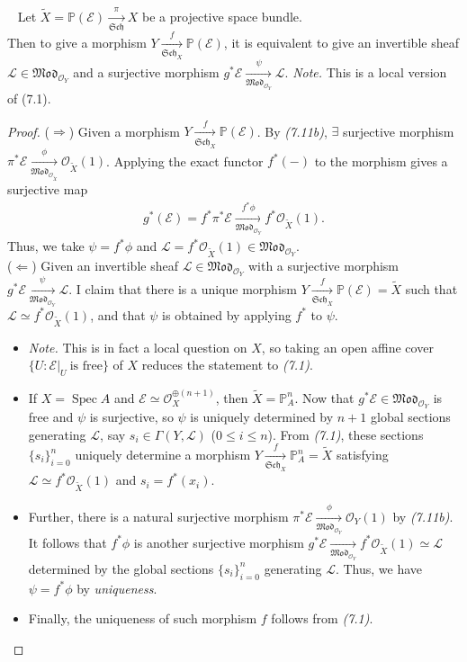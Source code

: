 \documentclass[11pt,a4paper,footinclude=true,headinclude=true]{scrbook} %
\DeclareMathOperator{\Spec}{Spec}
\newcommand{\EE}{\mathscr{E}}
\newcommand{\LL}{\mathscr{L}}
\newcommand{\OO}{\mathcal{O}}
\newcommand{\PP}{\mathbb{P}}
\newcommand{\Sch}{\mathfrak{Sch}}
\newcommand{\<}{\langle}
\newcommand{\>}{\rangle}
\newcommand{\MOD}{\mathfrak{Mod}}
\newenvironment{proposition}[2][]
{\renewcommand\theinnercustomprop{#2}\innercustomprop[#1] 
\begin{mdframed}[backgroundcolor=gray!20]\ }
{\end{mdframed}\endinnercustomprop}
\begin{document}
\begin{proposition}{7.12}
    Let $\widetilde{X}=\PP(\EE)\xrightarrow[\Sch]{\pi}X$ be a projective space bundle.\\ Then to give a morphism $Y\xrightarrow[\Sch_X]{f}\PP(\EE)$, it is equivalent to give an invertible sheaf $\LL\in\MOD_{\OO_Y}$ and a surjective morphism $g^\ast\EE\xrightarrow[\MOD_{\OO_Y}]{\psi}\LL$. \textit{Note.} This is a local version of (7.1).
\end{proposition}
\begin{proof}
    ($\Rightarrow$) Given a morphism $Y\xrightarrow[\Sch_X]{f}\PP(\EE)$. By \textit{(7.11b)}, $\exists$ surjective morphism $\pi^\ast\EE\xrightarrow[\MOD_{\OO_{\widetilde{X}}}]{\phi}\OO_{\widetilde{X}}(1)$. Applying the exact functor $f^\ast(-)$ to the morphism gives a surjective map 
    \begin{align*}
        g^\ast(\EE)=f^\ast\pi^\ast\EE\xrightarrow[\MOD_{\OO_Y}]{f^\ast\phi}f^\ast\OO_{\widetilde{X}}(1).
    \end{align*}
    Thus, we take $\psi=f^\ast\phi$ and $\LL=f^\ast\OO_{\widetilde{X}}(1)\in\MOD_{\OO_Y}$.\\
    
    ($\Leftarrow$) Given an invertible sheaf $\LL\in\MOD_{\OO_Y}$ with a surjective morphism $g^\ast\EE\xrightarrow[\MOD_{\OO_Y}]{\psi}\LL$. I claim that there is a unique morphism $Y\xrightarrow[\Sch_X]{f}\PP(\EE)=\widetilde{X}$ such that $\LL\simeq f^\ast\OO_{\widetilde{X}}(1)$, and that $\psi$ is obtained by applying $f^\ast$ to $\psi$.
    \begin{itemize}
        \item \textit{Note.} This is in fact a local question on $X$, so taking an open affine cover $\{U:\EE|_U\ \text{is free}\}$ of $X$ reduces the statement to \textit{(7.1)}.
        \item If $X=\Spec A$ and $\EE\simeq\OO_X^{\oplus(n+1)}$, then $\widetilde{X}=\PP_A^n$. Now that $g^\ast\EE\in\MOD_{\OO_Y}$ is free and $\psi$ is surjective, so $\psi$ is uniquely determined by $n+1$ global sections generating $\LL$, say $s_i\in\Gamma(Y,\LL)$ ($0\leq i\leq n$). From \textit{(7.1)}, these sections $\{s_i\}_{i=0}^n$ uniquely determine a morphism $Y\xrightarrow[\Sch_X]{f}\PP_A^n=\widetilde{X}$ satisfying $\LL\simeq f^\ast\OO_{\widetilde{X}}(1)$ and $s_i=f^\ast(x_i)$. 
        \item Further, there is a natural surjective morphism $\pi^\ast\EE\xrightarrow[\MOD_{\OO_Y}]{\phi}\OO_Y(1)$ by \textit{(7.11b)}. It follows that $f^\ast\phi$ is another surjective morphism $g^\ast\EE\xrightarrow[\MOD_{\OO_Y}]{}f^\ast\OO_{\widetilde{X}}(1)\simeq\LL$ determined by the global sections $\{s_i\}_{i=0}^n$ generating $\LL$. Thus, we have $\psi=f^\ast\phi$ by \textit{uniqueness}.
        \item Finally, the uniqueness of such morphism $f$ follows from \textit{(7.1)}.
    \end{itemize}
\end{proof}
\end{document}
